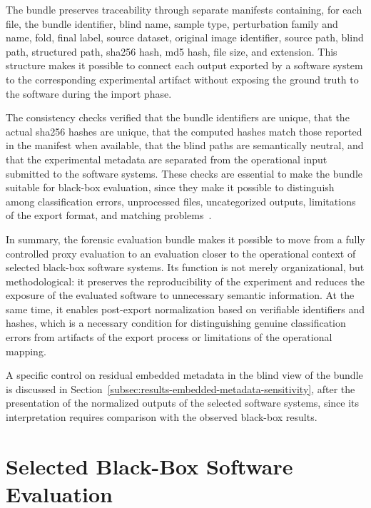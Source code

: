 The bundle preserves traceability through separate manifests containing, for
each file, the bundle identifier, blind name, sample type, perturbation family
and name, fold, final label, source dataset, original image identifier, source
path, blind path, structured path, \gls{sha256} hash, \gls{md5} hash, file
size, and extension. This structure makes it possible to connect each output
exported by a software system to the corresponding experimental artifact
without exposing the ground truth to the software during the import phase.

The consistency checks verified that the bundle identifiers are unique, that
the actual \gls{sha256} hashes are unique, that the computed hashes match those
reported in the manifest when available, that the blind paths are semantically
neutral, and that the experimental metadata are separated from the operational
input submitted to the software systems. These checks are essential to make the
bundle suitable for black-box evaluation, since they make it possible to
distinguish among classification errors, unprocessed files, uncategorized
outputs, limitations of the export format, and matching
problems~\cite{iso27041,iso27042,iso27043,swgde2014validation}.

In summary, the forensic evaluation bundle makes it possible to move from a
fully controlled proxy evaluation to an evaluation closer to the operational
context of selected black-box software systems. Its function is not merely
organizational, but methodological: it preserves the reproducibility of the
experiment and reduces the exposure of the evaluated software to unnecessary
semantic information. At the same time, it enables post-export normalization
based on verifiable identifiers and hashes, which is a necessary condition for
distinguishing genuine classification errors from artifacts of the export
process or limitations of the operational mapping.

A specific control on residual embedded metadata in the blind view of the
bundle is discussed in
Section~\ref{subsec:results-embedded-metadata-sensitivity}, after the
presentation of the normalized outputs of the selected software systems, since
its interpretation requires comparison with the observed black-box results.

\section{Selected Black-Box Software Evaluation} %

